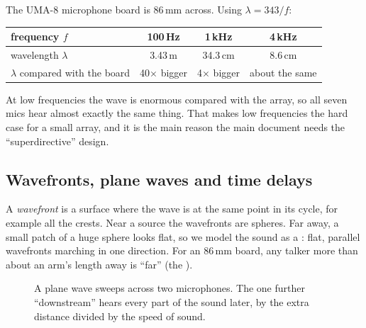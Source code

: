 \documentclass[11pt]{article}
\begin{document}
\begin{example}\label{ex:lambda}
The UMA-8 microphone board is $86$\,mm across. Using $\lambda=343/f$:
\begin{center}\small
\begin{tabular}{@{}lccc@{}}
\toprule
frequency $f$ & 100\,Hz & 1\,kHz & 4\,kHz\\
\midrule
wavelength $\lambda$ & 3.43\,m & 34.3\,cm & 8.6\,cm\\
$\lambda$ compared with the board & 40$\times$ bigger & 4$\times$ bigger & about the same\\
\bottomrule
\end{tabular}
\end{center}
At low frequencies the wave is enormous compared with the array, so all seven mics hear almost
exactly the same thing. That makes low frequencies the hard case for a small array, and it is
the main reason the main document needs the ``superdirective'' design.
\end{example}

\subsection{Wavefronts, plane waves and time delays}

A \emph{wavefront} is a surface where the wave is at the same point in its cycle, for example
all the crests. Near a source the wavefronts are spheres. Far away, a small patch of a huge
sphere looks flat, so we model the sound as a : flat, parallel
wavefronts marching in one direction. For an 86\,mm board, any talker more than about an arm's
length away is ``far'' (the ).

\begin{figure}[ht]
\centering
{}
\caption{A plane wave sweeps across two microphones. The one further ``downstream'' hears every
part of the sound later, by the extra distance divided by the speed of sound.}
\label{fig:planewave}
\end{figure}
\end{document}

